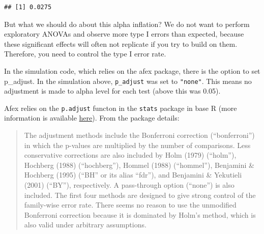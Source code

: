 \documentclass[
]{book}
\newenvironment{Shaded}{\begin{snugshade}}{\end{snugshade}}
\newcommand{\ControlFlowTok}[1]{\textcolor[rgb]{0.13,0.29,0.53}{\textbf{#1}}}
\newcommand{\DecValTok}[1]{\textcolor[rgb]{0.00,0.00,0.81}{#1}}
\newcommand{\FloatTok}[1]{\textcolor[rgb]{0.00,0.00,0.81}{#1}}
\newcommand{\FunctionTok}[1]{\textcolor[rgb]{0.00,0.00,0.00}{#1}}
\newcommand{\NormalTok}[1]{#1}
\newcommand{\SpecialCharTok}[1]{\textcolor[rgb]{0.00,0.00,0.00}{#1}}
\begin{document}
\begin{Shaded}
\end{Shaded}

\begin{verbatim}
## [1] 0.0275
\end{verbatim}

But what we should do about this alpha inflation? We do not want to perform exploratory ANOVAs and observe more type I errors than expected, because these significant effects will often not replicate if you try to build on them. Therefore, you need to control the type I error rate.

In the simulation code, which relies on the afex package, there is the option to set p\_adjust. In the simulation above, \texttt{p\_adjust} was set to \texttt{"none"}. This means no adjustment is made to alpha level for each test (above this was 0.05).

Afex relies on the \texttt{p.adjust} functon in the \texttt{stats} package in base R (more information is available \href{https://www.rdocumentation.org/packages/stats/versions/3.1.1/topics/p.adjust}{here}). From the package details:

\begin{quote}
The adjustment methods include the Bonferroni correction (``bonferroni'') in which the p-values are multiplied by the number of comparisons. Less conservative corrections are also included by Holm (1979) (``holm''), Hochberg (1988) (``hochberg''), Hommel (1988) (``hommel''), Benjamini \& Hochberg (1995) (``BH'' or its alias ``fdr''), and Benjamini \& Yekutieli (2001) (``BY''), respectively. A pass-through option (``none'') is also included. The first four methods are designed to give strong control of the family-wise error rate. There seems no reason to use the unmodified Bonferroni correction because it is dominated by Holm's method, which is also valid under arbitrary assumptions.
\end{quote}
\end{document}
